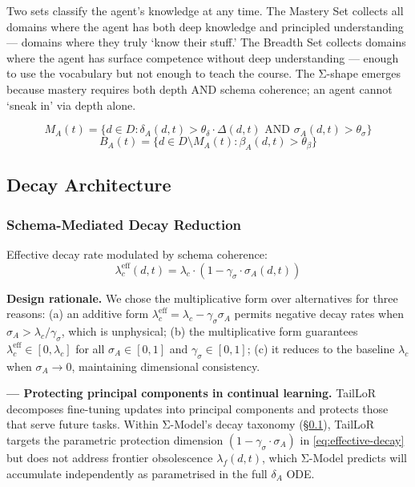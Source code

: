 \documentclass[11pt,a4paper]{article}
\begin{document}
Two sets classify the agent's knowledge at any time. The Mastery Set collects all domains where the agent has both deep knowledge and principled understanding --- domains where they truly `know their stuff.' The Breadth Set collects domains where the agent has surface competence without deep understanding --- enough to use the vocabulary but not enough to teach the course. The Σ-shape emerges because mastery requires both depth AND schema coherence; an agent cannot `sneak in' via depth alone.

\begin{equation}\label{eq:mastery-set}
M_A(t) = \{d \in D : \delta_A(d,t) > \theta_{\delta} \cdot \Delta(d,t) \text{ AND } \sigma_A(d,t) > \theta_{\sigma}\}
\end{equation}
\begin{equation}\label{eq:breadth-set}
B_A(t) = \{d \in D \setminus M_A(t) : \beta_A(d,t) > \theta_{\beta}\}
\end{equation}

\subsection{Decay Architecture}\label{sec:decay}

\subsubsection{Schema-Mediated Decay Reduction}

Effective decay rate modulated by schema coherence:
\begin{equation}\label{eq:effective-decay}
\lambda_c^{\text{eff}}(d,t) = \lambda_c \cdot (1 - \gamma_\sigma \cdot \sigma_A(d,t))
\end{equation}

\textbf{Design rationale.} We chose the multiplicative form over alternatives
for three reasons: (a) an additive form $\lambda_c^{\text{eff}} = \lambda_c - \gamma_\sigma \sigma_A$
permits negative decay rates when $\sigma_A > \lambda_c / \gamma_\sigma$, which is
unphysical; (b) the multiplicative form guarantees $\lambda_c^{\text{eff}} \in [0, \lambda_c]$
for all $\sigma_A \in [0,1]$ and $\gamma_\sigma \in [0,1]$; (c) it reduces to the
baseline $\lambda_c$ when $\sigma_A \to 0$, maintaining dimensional consistency.

\textbf{\cite{taillor2026} --- Protecting principal components in continual learning.}
TailLoR decomposes fine-tuning updates into principal components and protects
those that serve future tasks. Within Σ-Model's decay taxonomy
(\S\ref{sec:decay}), TailLoR targets the parametric protection dimension
$(1 - \gamma_\sigma \cdot \sigma_A)$ in \eqref{eq:effective-decay} but does not
address frontier obsolescence $\lambda_f(d,t)$, which Σ-Model predicts will
accumulate independently as parametrised in the full $\delta_A$ ODE.
\end{document}
